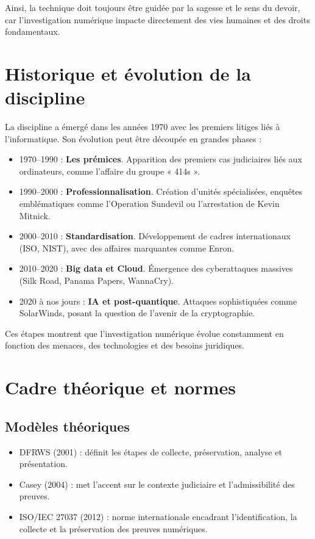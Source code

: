 \documentclass[12pt,a4paper]{article}
\begin{document}
Ainsi, la technique doit toujours être guidée par la sagesse et le sens du devoir, car l’investigation numérique impacte directement des vies humaines et des droits fondamentaux.

\section{Historique et évolution de la discipline}

La discipline a émergé dans les années 1970 avec les premiers litiges liés à l’informatique. Son évolution peut être découpée en grandes phases :

\begin{itemize}
    \item 1970--1990 : \textbf{Les prémices}. Apparition des premiers cas judiciaires liés aux ordinateurs, comme l’affaire du groupe « 414s ».
    \item 1990--2000 : \textbf{Professionnalisation}. Création d’unités spécialisées, enquêtes emblématiques comme l’Operation Sundevil ou l’arrestation de Kevin Mitnick.
    \item 2000--2010 : \textbf{Standardisation}. Développement de cadres internationaux (ISO, NIST), avec des affaires marquantes comme Enron.
    \item 2010--2020 : \textbf{Big data et Cloud}. Émergence des cyberattaques massives (Silk Road, Panama Papers, WannaCry).
    \item 2020 à nos jours : \textbf{IA et post-quantique}. Attaques sophistiquées comme SolarWinds, posant la question de l’avenir de la cryptographie.
\end{itemize}

Ces étapes montrent que l’investigation numérique évolue constamment en fonction des menaces, des technologies et des besoins juridiques.

\section{Cadre théorique et normes}

\subsection{Modèles théoriques}

\begin{itemize}
    \item DFRWS (2001) : définit les étapes de collecte, préservation, analyse et présentation.
    \item Casey (2004) : met l’accent sur le contexte judiciaire et l’admissibilité des preuves.
    \item ISO/IEC 27037 (2012) : norme internationale encadrant l’identification, la collecte et la préservation des preuves numériques.
\end{itemize}
\end{document}
